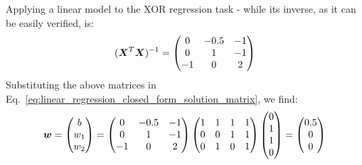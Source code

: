 \begin{frame}[t,allowframebreaks]{Applying a linear model to the XOR regression task -}
    while its inverse, as it can be easily verified, is:\\
    \vspace{-0.3cm}
    \begin{equation}
        (\boldsymbol{X}^T \boldsymbol{X})^{-1} = 
        \begin{pmatrix}
            0 & -0.5 & -1 \\
            0 &  1   & -1 \\
           -1 &  0   &  2 \\
        \end{pmatrix} 
    \end{equation}        
    \vspace{-0.5cm}
    Substituting the above matrices 
    in Eq.~\ref{eq:linear_regression_closed_form_solution_matrix}, we find:\\
    \begin{equation}
        \boldsymbol{w} 
        = 
        \begin{pmatrix}
            b   \\
            w_1 \\
            w_2 \\
        \end{pmatrix} 
        =
        \begin{pmatrix}
            0 & -0.5 & -1 \\
            0 &  1   & -1 \\
           -1 &  0   &  2 \\
        \end{pmatrix} 
        \begin{pmatrix}
            1 & 1 & 1 & 1 \\
            0 & 0 & 1 & 1 \\
            0 & 1 & 0 & 1 \\
        \end{pmatrix} 
        \begin{pmatrix}
            0 \\
            1 \\
            1 \\
            0 \\
        \end{pmatrix} 
        =
        \begin{pmatrix}
            0.5 \\
            0 \\
            0 \\
        \end{pmatrix} 
        \label{eq:learn_xor_linear_model_weights}
    \end{equation}        


\end{frame}
